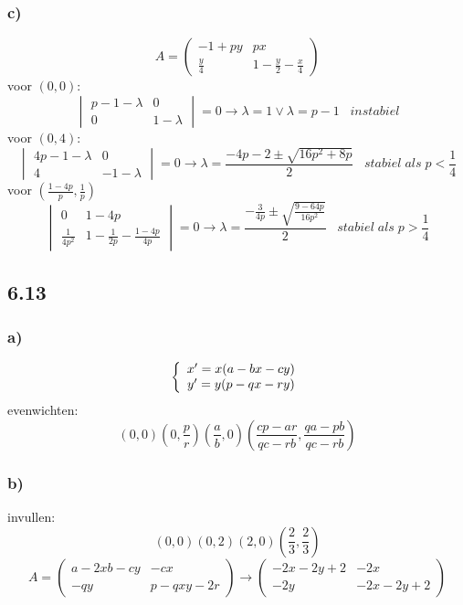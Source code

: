 \documentclass[11pt]{article}
\begin{document}
\subsubsection*{c)}
\[
A=
\begin{pmatrix}
-1+py & px\\
\frac{y}{4} & 1-\frac{y}{2}-\frac{x}{4}
\end{pmatrix}
\]
voor $(0,0)$:
\[
\begin{vmatrix}
p-1-\lambda & 0 \\
0 & 1-\lambda
\end{vmatrix}
=0
\longrightarrow \lambda=1 \vee \lambda=p-1
\;\;\; instabiel
\]
voor $(0,4)$:
\[
\begin{vmatrix}
4p-1-\lambda & 0\\
4 & -1-\lambda
\end{vmatrix}
=0
\longrightarrow
\lambda = \frac{-4p-2 \pm \sqrt{16p^2+8p}}{2}
\;\;\; stabiel\;als\;p<\frac{1}{4}
\]
voor $(\frac{1-4p}{p},\frac{1}{p})$
\[
\begin{vmatrix}
0 & 1-4p\\
\frac{1}{4p^2} & 1-\frac{1}{2p}-\frac{1-4p}{4p}
\end{vmatrix}
=0
\longrightarrow
\lambda = \frac{-\frac{3}{4p} \pm \sqrt{\frac{9-64p}{16p^2}}}{2}
\;\;\; stabiel\;als\;p>\frac{1}{4}
\]

\subsection*{6.13}
\subsubsection*{a)}
\[
\left\lbrace
\begin{array}{c c}
x' = x(a-bx-cy)\\
y' = y(p-qx-ry)
\end{array}
\right.
\]
evenwichten: 
\[
(0,0) (0,\frac{p}{r}) (\frac{a}{b},0) (\frac{cp-ar}{qc-rb},\frac{qa-pb}{qc-rb})
\]

\subsubsection*{b)}
invullen:
\[
(0,0) (0,2) (2,0) (\frac{2}{3},\frac{2}{3})
\]
\[
A = 
\begin{pmatrix}
a-2xb-cy & -cx\\
-qy & p-qxy-2r
\end{pmatrix}
\longrightarrow
\begin{pmatrix}
-2x-2y+2 & -2x\\
-2y & -2x-2y+2
\end{pmatrix}
\]
\end{document}
